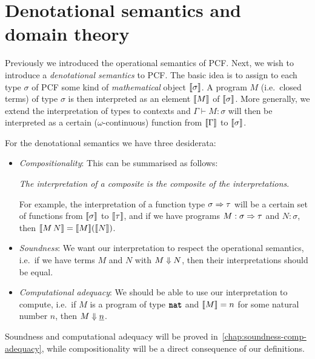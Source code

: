 \chapter[{Denotational semantics and domain theory}]{Denotational semantics and \\ domain theory}\label{chap:domains}

Previously we introduced the operational semantics of PCF. Next, we wish to
introduce a \emph{denotational semantics} to PCF. The basic idea is to assign to
each type \(\sigma\) of PCF some kind of \emph{mathematical} object
\(\llbracket\sigma\rrbracket\).
%
A program \(M\) (i.e.\ closed terms) of type \(\sigma\) is then interpreted as
an element \(\llbracket M\rrbracket\) of \(\llbracket\sigma\rrbracket\).
%
More generally, we extend the interpretation of types to contexts and
\(\Gamma \vdash M : \sigma\) will then be interpreted as a certain
(\(\omega\)-continuous) function from \(\llbracket\Gamma\rrbracket\) to
\(\llbracket\sigma\rrbracket\).

For the denotational semantics we have three desiderata:

\begin{itemize}[itemsep=2mm,topsep=3mm]
\item\emph{Compositionality}: This can be summarised as follows:
  \begin{displayquote}
    \emph{The interpretation of a composite is the composite of the interpretations}.
  \end{displayquote}

  For example, the interpretation of a function type \(\sigma \Rightarrow \tau\)
  will be a certain set of functions from \(\llbracket\sigma\rrbracket\) to
  \(\llbracket\tau\rrbracket\), and if we have programs \(M : \sigma \Rightarrow \tau\) and
  \(N : \sigma\), then \(\llbracket M \, N\rrbracket = \llbracket M\rrbracket(\llbracket N\rrbracket)\).
\item\emph{Soundness}: We want our interpretation to respect the operational
  semantics, i.e.\ if we have terms \(M\) and \(N\) with
  \(M \Downarrow N\), then their interpretations should be equal.
\item\emph{Computational adequacy}: We should be able to use our
  interpretation to compute, i.e.\ if \(M\) is a program of type \(\texttt{\textbf{nat}}\)
  and \(\llbracket M\rrbracket = n\) for some natural number \(n\), then
  \(M \Downarrow \underline{n}\).
\end{itemize}

Soundness and computational adequacy will be proved
in~\cref{chap:soundness-comp-adequacy}, while compositionality will be a direct
consequence of our definitions.

